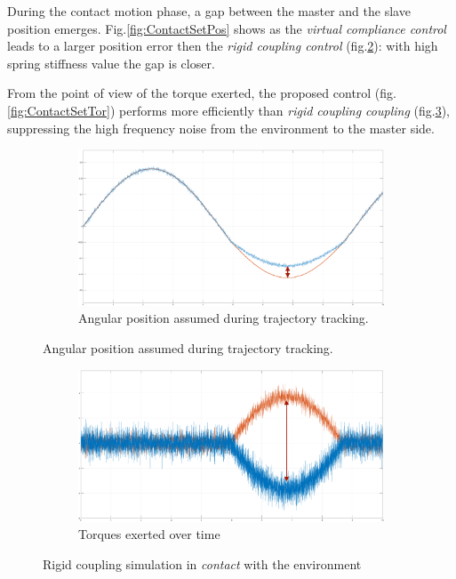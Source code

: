 
During the contact motion phase, a gap between the master and the slave position emerges. Fig.\ref{fig:ContactSetPos} shows as the \textit{virtual compliance control} leads to a larger position error then the \textit{rigid coupling control }(fig.\ref{fig:ContactRigPos}): with high spring stiffness value the gap is closer.

From the point of view of the torque exerted, the proposed control
(fig.\ref{fig:ContactSetTor}) performs more efficiently than \textsl{rigid coupling coupling} (fig.\ref{fig:ContactRigTor}), suppressing the high frequency noise from the environment to the master side.

  
\begin{figure}[H]
	\begin{subfigure}{1\linewidth}
		\centering
		\includegraphics[width=\textwidth, height=0.41\textwidth]{Images/rigidContactReacPosArrow}
		\caption{ Angular position assumed during trajectory tracking.}
		\label{fig:ContactRigPos}
	\end{subfigure}	
\end{figure}
\begin{figure}[H]\ContinuedFloat
	\begin{subfigure}{1\linewidth}
		\centering
		\includegraphics[width=\textwidth, height=0.41\textwidth]{Images/rigidContactReacTorArrow}
		\caption{ Torques exerted over time}
		\label{fig:ContactRigTor}
	\end{subfigure}	
  \caption{ Rigid coupling simulation in \textsl{contact} with the environment}
  \label{fig:contact_rigid}
\end{figure}

